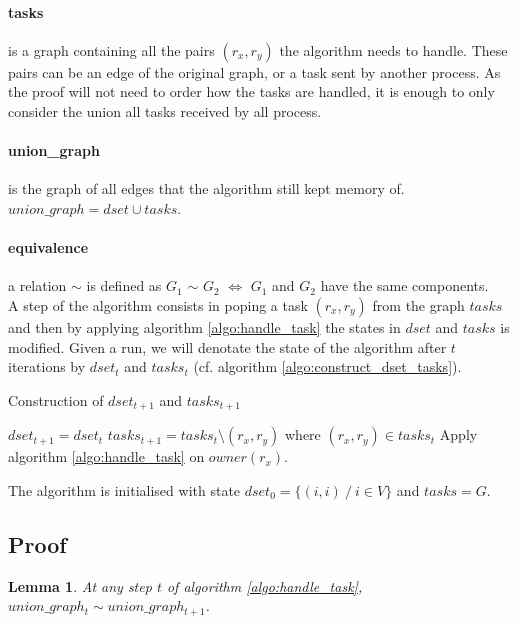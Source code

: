 \documentclass[12px]{article}
\newtheorem{lemma}[theorem]{Lemma}
\begin{document}
    \paragraph{tasks} is a graph containing all the pairs $(r_x, r_y)$ the algorithm needs to handle. These pairs can be an edge of the original graph, or a task sent by another process. As the proof will not need to order how the tasks are handled, it is enough to only consider the union all tasks received by all process.

    \paragraph{union\_graph} is the graph of all edges that the algorithm still kept memory of. $union\_graph = dset \cup tasks$.

    \paragraph{equivalence} a relation $\sim$ is defined as $G_1$ $\sim$ $G_2$ $\Leftrightarrow$ $G_1$ and $G_2$ have the same components. \\

    A step of the algorithm consists in poping a task $(r_x, r_y)$ from the graph $tasks$ and then by applying algorithm \ref{algo:handle_task} the states in $dset$ and $tasks$ is modified.
    Given a run, we will denotate the state of the algorithm after $t$ iterations by $dset_t$ and $tasks_t$ (cf. algorithm \ref{algo:construct_dset_tasks}).

    \begin{algorithm}
      \caption{Construction of $dset_{t+1}$ and $tasks_{t+1}$}
      \begin{algorithmic}[1]
        \State $dset_{t+1} = dset_t$
        \State $tasks_{t+1} = tasks_t \setminus (r_x, r_y)$ where $(r_x, r_y) \in tasks_t$
        \State Apply algorithm \ref{algo:handle_task} on $owner(r_x)$.
      \end{algorithmic}
      \label{algo:construct_dset_tasks}
    \end{algorithm}

    The algorithm is initialised with state $dset_0 = \{(i, i)~/~i \in V\}$ and $tasks = G$.

  \subsection{Proof}
    \begin{lemma}
      \label{lemma:transitivity}
      At any step $t$ of algorithm \ref{algo:handle_task}, $union\_graph_t \sim union\_graph_{t+1}$.
    \end{lemma}
\end{document}
